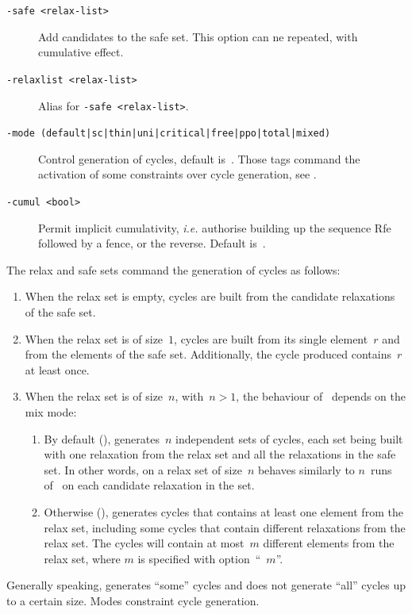 \begin{description}
\item[{\tt -safe <relax-list>}] Add candidates to the safe set. This option can ne repeated, with cumulative effect.
\item[{\tt -relaxlist <relax-list>}] Alias for \texttt{-safe <relax-list>}.
\item[{\tt -mode (default|sc|thin|uni|critical|free|ppo|total|mixed)}]
Control generation  of cycles, default is~.
Those tags command the activation of some constraints over cycle
generation, see .
\item[{\tt -cumul <bool>}]
Permit implicit cumulativity,
\emph{i.e.} authorise building up the sequence Rfe followed by a fence,
or the reverse. Default is~.
\end{description}
The relax and safe sets command the generation of
cycles as follows:
\begin{enumerate}
\item When the relax set is empty,
cycles are built from the candidate relaxations of the safe set.
\item When the relax set is of size~$1$,
cycles are built from its single element~$r$ and from the elements of
the safe set. Additionally, the cycle produced contains~$r$ at least once.
\item
When the relax set is of size~$n$, with~$n > 1$,
the behaviour of~\diy{} depends on the mix mode:
\begin{enumerate}
\item
By default (),
\diy{} generates~$n$ independent sets of cycles,
each set being built with one relaxation from the relax set and all
the relaxations in the safe set.
In other words, \diy{} on a relax set of size~$n$ behaves similarly
to $n$~runs of~\diy{} on each candidate relaxation in the set.
\item Otherwise (), \diy{} generates cycles that contains
at least one element from the relax set, including some cycles
that contain different relaxations from the relax set.
The cycles will contain at most~$m$ different elements from the relax set,
where $m$ is specified with option~``~$m$''.
\end{enumerate}
\end{enumerate}

\label{mode:describe}Generally
speaking, \diy{} generates ``some'' cycles and does not generate
``all'' cycles up to a certain size. Modes constraint cycle generation.

